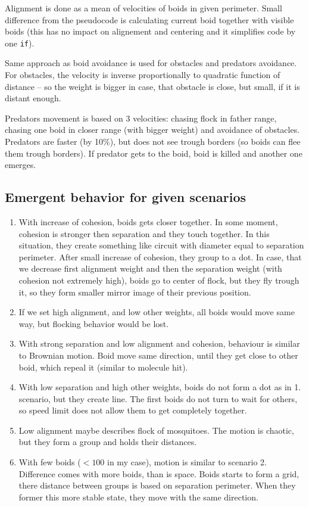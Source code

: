 \documentclass[a4paper,12pt]{article}
\begin{document}
Alignment is done as a mean of velocities of boids in given perimeter. Small difference from the pseudocode is calculating current boid together with visible boids (this has no impact on alignement and centering and it simplifies code by one \texttt{if}).

Same approach as boid avoidance is used for obstacles and predators avoidance. For obstacles, the velocity is inverse proportionally to quadratic function of distance -- so the weight is bigger in case, that obstacle is close, but small, if it is distant enough.

Predators movement is based on 3 velocities: chasing flock in father range, chasing one boid in closer range (with bigger weight) and avoidance of obstacles. Predators are faster (by 10\%), but does not see trough borders (so boids can flee them trough borders). If predator gets to the boid, boid is killed and another one emerges.

\subsection*{Emergent behavior for given scenarios}

\begin{enumerate}
\itemsep-0.5em
    \item With increase of cohesion, boids gets closer together. In some moment, cohesion is stronger then separation and they touch together. In this situation, they create something like circuit with diameter equal to separation perimeter. After small increase of cohesion, they group to a dot. In case, that we decrease first alignment weight and then the separation weight (with cohesion not extremely high), boids go to center of flock, but they fly trough it, so they form smaller mirror image of their previous position.
    \item If we set high alignment, and low other weights, all boids would move same way, but flocking behavior would be lost.
    \item With strong separation and low alignment and cohesion, behaviour is similar to Brownian motion. Boid move same direction, until they get close to other boid, which repeal it (similar to molecule hit).
    \item With low separation and high other weights, boids do not form a dot as in 1. scenario, but they create line. The first boids do not turn to wait for others, so speed limit does not allow them to get completely together.
    \item Low alignment maybe describes flock of mosquitoes. The motion is chaotic, but they form a group and holds their distances.
    \item With few boids ($< 100$ in my case), motion is similar to scenario 2. Difference comes with more boids, than is space. Boids starts to form a grid, there distance between groups is based on separation perimeter. When they former this more stable state, they move with the same direction.
\end{enumerate}
\end{document}
